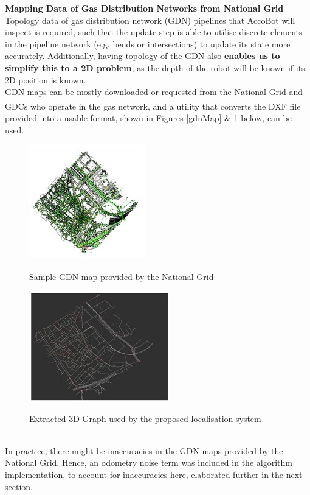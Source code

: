 \documentclass[11pt]{article}		%
\newlength{\imageheight}	 %
\newcommand{\supercite}[1]{\textsuperscript{\cite{#1}}}		%
\begin{document}
        \textbf{Mapping Data of Gas Distribution Networks from National Grid}
        \\
        Topology data of gas distribution network (GDN) pipelines that AccoBot will inspect is required, such that the update step is able to utilise discrete elements in the pipeline network (e.g. bends or intersections) to update its state more accurately. Additionally, having topology of the GDN also \textbf{enables us to simplify this to a 2D problem}, as the depth of the robot will be known if its 2D position is known.
        \\
        \hspace*{2ex}GDN maps can be mostly downloaded or requested from the National Grid and GDCs who operate in the gas network\supercite{GDNMap}, and a utility that converts the DXF file provided into a usable format, shown in \hyperref[gdnMap]{Figures \ref*{gdnMap} \& \ref*{localisationMap}} below, can be used.
			\begin{figure}[h]
					\centering
					\begin{multicols}{2}
						\includegraphics[height=\imageheight]{map1.jpg}
						\caption{Sample GDN map provided by the National Grid\supercite{sewerpaper}}
						\label{gdnMap}
						\columnbreak
						\includegraphics[height=\imageheight]{map2.jpg}
						\caption{Extracted 3D Graph used by the proposed localisation system}
						\label{localisationMap}
					\end{multicols}
				\end{figure}
        \\
        \hspace*{2ex}In practice, there might be inaccuracies in the GDN maps provided by the National Grid. Hence, an odometry noise term was included in the algorithm implementation, to account for inaccuracies here, elaborated further in the next section. 
        
\end{document}
